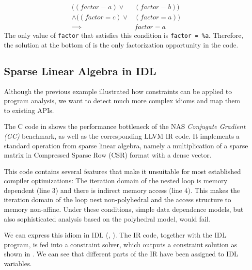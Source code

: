 \begin{equation}
\begin{split}
((factor = a) \lor & (factor = b)) \\\land ((factor = c) \lor & (factor = a)) \\
\implies & factor = a 
\end{split}
\nonumber
\end{equation}
The only value of {\tt factor} that satisfies this condition is {\tt factor = \%a}.
Therefore, the solution at the bottom of  is the only factorization opportunity in the code.

\begin{figure}[p]
    
\end{figure}

\subsection{Sparse Linear Algebra in IDL}

    Although the previous example illustrated how constraints can be applied to 
    program analysis, we want to detect much more complex idioms and 
    map them to existing APIs.

    The C code in  shows the performance bottleneck of
    the NAS \emph{Conjugate Gradient (GC)} benchmark, as well as the
    corresponding LLVM IR code.
    It implements a standard operation from sparse linear algebra, namely a
    multiplication of a sparse matrix in Compressed Sparse Row (CSR) format with
    a dense vector.

    This code contains several features that make it unsuitable for most
    established compiler optimizations:
    The iteration domain of the nested loop is memory dependent (line 3) and
    there is indirect memory access (line 4).
    This makes the iteration domain of the loop nest non-polyhedral and the
    access structure to memory non-affine.
    Under these conditions, simple data dependence models, but also
    sophisticated analysis based on the polyhedral model, would fail.

    We can express this idiom in IDL (, ).
    The IR code, together with the IDL program, is fed into a constraint solver,
    which outputs a constraint solution as shown in .
    We can see that different parts of the IR have been assigned to IDL
    variables.

